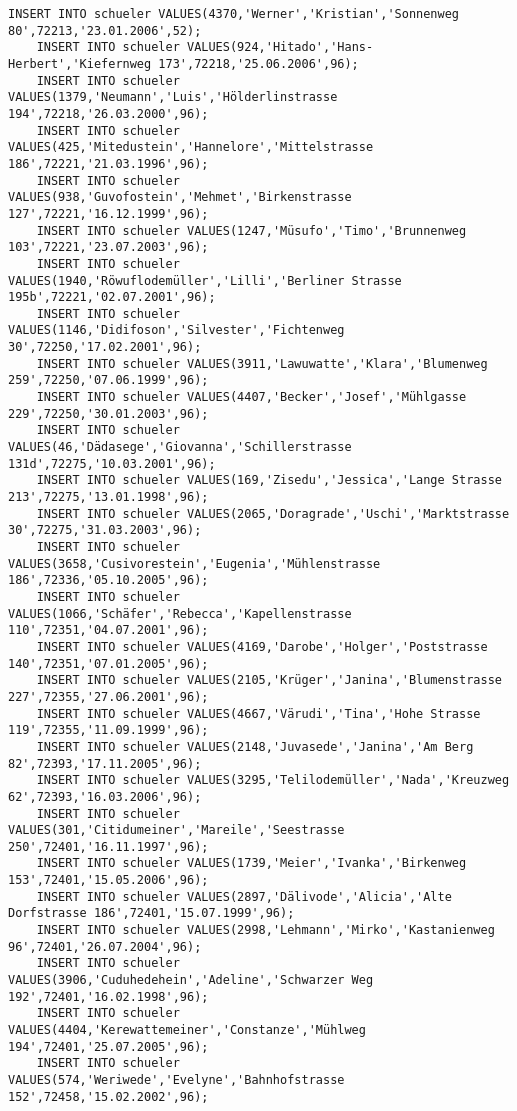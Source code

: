 \begin{lstlisting}[breaklines=True, numbers=none, basicstyle=\tiny, keepspaces=false]
	INSERT INTO schueler VALUES(4370,'Werner','Kristian','Sonnenweg 80',72213,'23.01.2006',52);
	INSERT INTO schueler VALUES(924,'Hitado','Hans-Herbert','Kiefernweg 173',72218,'25.06.2006',96);
	INSERT INTO schueler VALUES(1379,'Neumann','Luis','Hölderlinstrasse 194',72218,'26.03.2000',96);
	INSERT INTO schueler VALUES(425,'Mitedustein','Hannelore','Mittelstrasse 186',72221,'21.03.1996',96);
	INSERT INTO schueler VALUES(938,'Guvofostein','Mehmet','Birkenstrasse 127',72221,'16.12.1999',96);
	INSERT INTO schueler VALUES(1247,'Müsufo','Timo','Brunnenweg 103',72221,'23.07.2003',96);
	INSERT INTO schueler VALUES(1940,'Röwuflodemüller','Lilli','Berliner Strasse 195b',72221,'02.07.2001',96);
	INSERT INTO schueler VALUES(1146,'Didifoson','Silvester','Fichtenweg 30',72250,'17.02.2001',96);
	INSERT INTO schueler VALUES(3911,'Lawuwatte','Klara','Blumenweg 259',72250,'07.06.1999',96);
	INSERT INTO schueler VALUES(4407,'Becker','Josef','Mühlgasse 229',72250,'30.01.2003',96);
	INSERT INTO schueler VALUES(46,'Dädasege','Giovanna','Schillerstrasse 131d',72275,'10.03.2001',96);
	INSERT INTO schueler VALUES(169,'Zisedu','Jessica','Lange Strasse 213',72275,'13.01.1998',96);
	INSERT INTO schueler VALUES(2065,'Doragrade','Uschi','Marktstrasse 30',72275,'31.03.2003',96);
	INSERT INTO schueler VALUES(3658,'Cusivorestein','Eugenia','Mühlenstrasse 186',72336,'05.10.2005',96);
	INSERT INTO schueler VALUES(1066,'Schäfer','Rebecca','Kapellenstrasse 110',72351,'04.07.2001',96);
	INSERT INTO schueler VALUES(4169,'Darobe','Holger','Poststrasse 140',72351,'07.01.2005',96);
	INSERT INTO schueler VALUES(2105,'Krüger','Janina','Blumenstrasse 227',72355,'27.06.2001',96);
	INSERT INTO schueler VALUES(4667,'Värudi','Tina','Hohe Strasse 119',72355,'11.09.1999',96);
	INSERT INTO schueler VALUES(2148,'Juvasede','Janina','Am Berg 82',72393,'17.11.2005',96);
	INSERT INTO schueler VALUES(3295,'Telilodemüller','Nada','Kreuzweg 62',72393,'16.03.2006',96);
	INSERT INTO schueler VALUES(301,'Citidumeiner','Mareile','Seestrasse 250',72401,'16.11.1997',96);
	INSERT INTO schueler VALUES(1739,'Meier','Ivanka','Birkenweg 153',72401,'15.05.2006',96);
	INSERT INTO schueler VALUES(2897,'Dälivode','Alicia','Alte Dorfstrasse 186',72401,'15.07.1999',96);
	INSERT INTO schueler VALUES(2998,'Lehmann','Mirko','Kastanienweg 96',72401,'26.07.2004',96);
	INSERT INTO schueler VALUES(3906,'Cuduhedehein','Adeline','Schwarzer Weg 192',72401,'16.02.1998',96);
	INSERT INTO schueler VALUES(4404,'Kerewattemeiner','Constanze','Mühlweg 194',72401,'25.07.2005',96);
	INSERT INTO schueler VALUES(574,'Weriwede','Evelyne','Bahnhofstrasse 152',72458,'15.02.2002',96);

\end{lstlisting}
